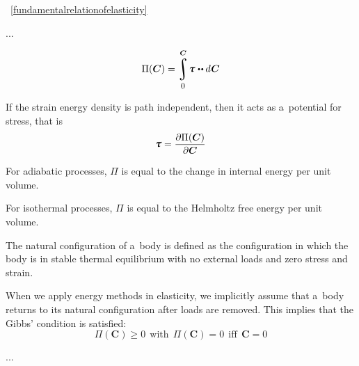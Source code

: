 ~\eqref{fundamentalrelationofelasticity}

...

{\small

\[ \Pi({\boldsymbol{\bm{C}}}) = \displaystyle \integral_{\raisemath{-0.25em}{\hspace{-0.1ex}\scalebox{0.85}{$0$}}}^{\raisemath{.15em}{\bm{C}}} \hspace{-0.25ex} \mathboldtau \hspace{.1ex} \dotdotp d \hspace{.1ex} \boldsymbol{\bm{C}} \]

If the strain energy density is path independent, then it acts as a~potential for stress, that is
\[ \displaystyle \mathboldtau = {\frac{\partial \Pi(\bm{C})}{\partial \bm{C}}} \]

For adiabatic processes, ${\Pi}$ is equal to the change in internal energy per unit volume.

For isothermal processes, ${\Pi}$ is equal to the Helmholtz free energy per unit volume.

The natural configuration of a~body is defined as the configuration in which the body is in stable thermal equilibrium with no external loads and zero stress and strain.

When we apply energy methods in elasticity, we implicitly assume that a~body returns to its natural configuration after loads are removed. This implies that the Gibbs’ condition is satisfied:
\[ \Pi({\boldsymbol{\bm{C}}}) \geq 0~~{\text{with}}~~\Pi({\boldsymbol{\bm{C}}}) = 0~~{\text{iff}}~~{\boldsymbol{\bm{C}}} = 0 \]

\par}

...

